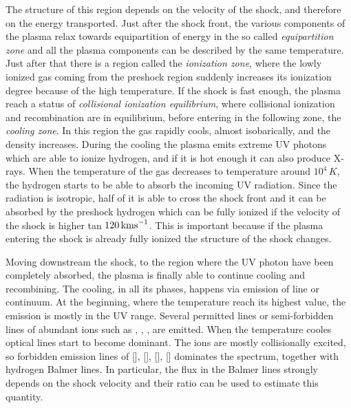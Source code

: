 \documentclass[../thesis.tex]{subfiles}
\begin{document}
The structure of this region depends on the velocity of the shock, and therefore on the energy transported.
Just after the shock front, the various components of the plasma relax towards equipartition of energy in the so called \emph{equipartition zone} and all the plasma components can be described by the same temperature.
Just after that there is a region called the \emph{ionization zone}, where the lowly ionized gas coming from the preshock region suddenly increases its ionization degree because of the high temperature. 
If the shock is fast enough, the plasma reach a status of \emph{collisional ionization equilibrium}, where collisional ionization and recombination are in equilibrium, before entering in the following zone, the \emph{cooling zone}.
In this region the gas rapidly cools, almost isobarically, and the density increases.
During the cooling the plasma emits extreme UV photons which are able to ionize hydrogen, and if it is hot enough it can also produce X-rays.
When the temperature of the gas decreases to temperature around $10^4\,\si{K}$, the hydrogen starts to be able to absorb the incoming UV radiation.
Since the radiation is isotropic, half of it is able to cross the shock front and it can be absorbed by the preshock hydrogen which can be fully ionized if the velocity of the shock is higher tan $120\,\si{\kms}$.
This is important because if the plasma entering the shock is already fully ionized the structure of the shock changes.

Moving downstream the shock, to the region where the UV photon have been completely absorbed, the plasma is finally able to continue cooling and recombining.
The cooling, in all its phases, happens via emission of line or continuum.
At the beginning, where the temperature reach its highest value, the emission is mostly in the UV range.
Several permitted lines or semi-forbidden lines of abundant ions such as , , ,  are emitted.
When the temperature cooles optical lines start to become dominant.
The ions are mostly collisionally excited, so forbidden emission lines of [], [], [], [] dominates the spectrum, together with hydrogen Balmer lines.
In particular, the flux in the Balmer lines strongly depends on the shock velocity and their ratio can be used to estimate this quantity.







\biblio
\end{document}
